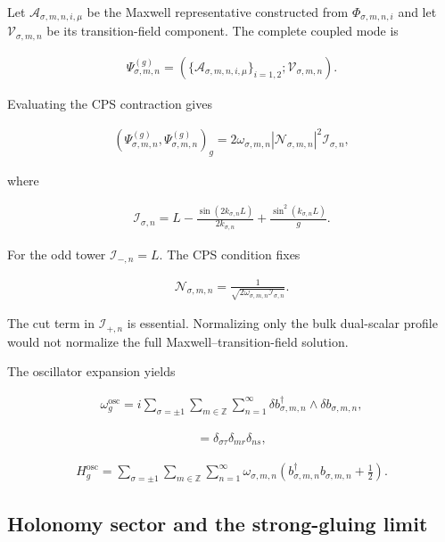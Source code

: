 Let $\mathcal A_{\sigma,m,n,i,\mu}$ be the Maxwell representative constructed from $\Phi_{\sigma,m,n,i}$ and let $\mathcal V_{\sigma,m,n}$ be its transition-field component. The complete coupled mode is

\begin{align}
\Psi_{\sigma,m,n}^{(g)}
=\left(\{\mathcal A_{\sigma,m,n,i,\mu}\}_{i=1,2};
\mathcal V_{\sigma,m,n}\right).
\end{align}

Evaluating the CPS contraction gives

\begin{align}
(\Psi_{\sigma,m,n}^{(g)},\Psi_{\sigma,m,n}^{(g)})_g
=2\omega_{\sigma,m,n}|\mathcal N_{\sigma,m,n}|^2
\mathcal I_{\sigma,n},
\end{align}

where

\begin{align}
\mathcal I_{\sigma,n}
=L-\frac{\sin(2k_{\sigma,n}L)}{2k_{\sigma,n}}
+\frac{\sin^2(k_{\sigma,n}L)}{g}.
\end{align}

For the odd tower $\mathcal I_{-,n}=L$. The CPS condition fixes

\begin{align}
\mathcal N_{\sigma,m,n}
=\frac{1}{\sqrt{2\omega_{\sigma,m,n}\mathcal I_{\sigma,n}}}.
\end{align}

The cut term in $\mathcal I_{+,n}$ is essential. Normalizing only the bulk dual-scalar profile would not normalize the full Maxwell--transition-field solution.

The oscillator expansion yields

\begin{align}
\omega_g^{\mathrm{osc}}
=i\sum_{\sigma=\pm1}\sum_{m\in\mathbb Z}\sum_{n=1}^\infty
\delta b_{\sigma,m,n}^\dagger\wedge\delta b_{\sigma,m,n},
\end{align}

\begin{align}
[b_{\sigma,m,n},b_{\tau,r,s}^\dagger]
=\delta_{\sigma\tau}\delta_{mr}\delta_{ns},
\end{align}

\begin{align}
H_g^{\mathrm{osc}}
=\sum_{\sigma=\pm1}\sum_{m\in\mathbb Z}\sum_{n=1}^\infty
\omega_{\sigma,m,n}
\left(b_{\sigma,m,n}^\dagger b_{\sigma,m,n}+\frac12\right).
\end{align}

\subsection{Holonomy sector and the strong-gluing limit}\label{subsec:maxwell-holonomy}

